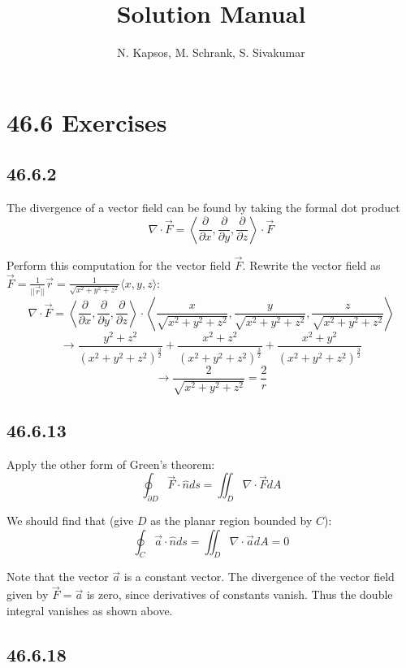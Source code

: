 \documentclass{article}
\title{Solution Manual}
\author{N. Kapsos, M. Schrank, S. Sivakumar}
\date{}
\begin{document}
\maketitle
\setcounter{secnumdepth}{0}

\section{46.6 Exercises}

\subsection{46.6.2}

The divergence of a vector field can be found by taking the formal dot product $$\nabla \cdot \vec{F} = \left\langle \frac{\partial}{\partial x}, \frac{\partial}{\partial y} ,\frac{\partial}{\partial z} \right\rangle \cdot \vec{F}$$

Perform this computation for the vector field $\vec{F}$. Rewrite the vector field as $\vec{F} = \frac{1}{||\vec{r}||}\vec{r} = \frac{1}{\sqrt{x^2+y^2+z^2}}\langle x,y,z\rangle$:
$$\nabla \cdot \vec{F} = \left\langle \frac{\partial}{\partial x}, \frac{\partial}{\partial y} ,\frac{\partial}{\partial z} \right\rangle \cdot \left\langle \frac{x}{\sqrt{x^2+y^2+z^2}},\frac{y}{\sqrt{x^2+y^2+z^2}},\frac{z}{\sqrt{x^2+y^2+z^2}}\right\rangle$$
$$\to \frac{y^2+z^2}{(x^2+y^2+z^2)^{\frac{3}{2}}}+\frac{x^2+z^2}{(x^2+y^2+z^2)^{\frac{3}{2}}}+\frac{x^2+y^2}{(x^2+y^2+z^2)^{\frac{3}{2}}}$$
$$\to \frac{2}{\sqrt{x^2+y^2+z^2}}=\frac{2}{r}$$

\subsection{46.6.13}

Apply the other form of Green's theorem:
$$\oint_{\partial D}\vec{F}\cdot \hat{n}ds = \iint_D \nabla\cdot\vec{F}dA$$

We should find that (give $D$ as the planar region bounded by $C$):
$$\oint_C \vec{a}\cdot\hat{n}ds = \iint_D \nabla\cdot\vec{a} dA = 0$$

Note that the vector $\vec{a}$ is a constant vector. The divergence of the vector field given by $\vec{F}=\vec{a}$ is zero, since derivatives of constants vanish. Thus the double integral vanishes as shown above.

\subsection{46.6.18}
\end{document}
